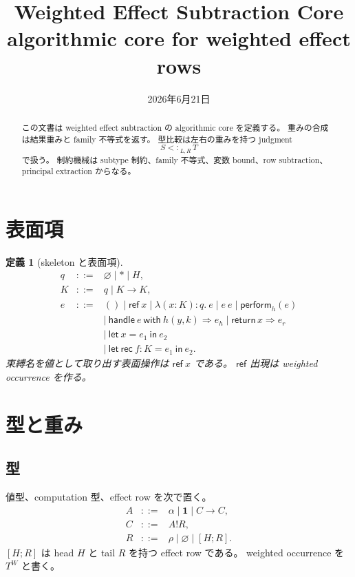 \documentclass[uplatex,dvipdfmx,a4paper,11pt]{jsarticle}
\title{Weighted Effect Subtraction Core\\
\large algorithmic core for weighted effect rows}
\author{}
\date{2026年6月21日}
\theoremstyle{jpplain}
\newtheorem{definition}{定義}[section]
\newcommand{\eff}{\mathbin{!}}
\newcommand{\row}[2]{[#1;#2]}
\newcommand{\emptyrow}{\varnothing}
\newcommand{\Unit}{\mathbf 1}
\newcommand{\subty}[3]{#1\mathrel{<:}_{#2,#3}}
\newcommand{\wocc}[2]{#1^{#2}}
\newcommand{\perform}{\mathsf{perform}}
\newcommand{\ret}{\mathsf{return}}
\newcommand{\handle}{\mathsf{handle}}
\newcommand{\with}{\mathsf{with}}
\begin{document}
\maketitle

\begin{abstract}
この文書は weighted effect subtraction の algorithmic core を定義する。
重みの合成は結果重みと family 不等式を返す。
型比較は左右の重みを持つ judgment
\[
  \subty{S}{L}{R}\,T
\]
で扱う。
制約機械は subtype 制約、family 不等式、変数 bound、row subtraction、principal extraction からなる。
\end{abstract}

\tableofcontents

\section{表面項}

\begin{definition}[skeleton と表面項]
\[
\begin{array}{rcl}
 q &::=& \emptyrow \mid \ast \mid H,\\
 K &::=& q \mid K\to K,\\[0.3em]
 e &::=& () \mid \mathsf{ref}\ x \mid \lambda(x:K):q.\ e \mid e\ e \mid \perform_h(e)\\
   && \mid\ \handle\ e\ \with\ h(y,k)\Rightarrow e_h\mid \ret\,x\Rightarrow e_r\\
   && \mid\ \mathsf{let}\ x=e_1\ \mathsf{in}\ e_2\\
   && \mid\ \mathsf{let\ rec}\ f:K=e_1\ \mathsf{in}\ e_2.
\end{array}
\]
束縛名を値として取り出す表面操作は \(\mathsf{ref}\ x\) である。
\(\mathsf{ref}\) 出現は weighted occurrence を作る。
\end{definition}

\section{型と重み}

\subsection{型}

値型、computation 型、effect row を次で置く。
\[
\begin{array}{rcl}
 A &::=& \alpha \mid \Unit \mid C\to C,\\
 C &::=& A\eff R,\\
 R &::=& \rho \mid \emptyrow \mid \row H R.
\end{array}
\]
\(\row H R\) は head \(H\) と tail \(R\) を持つ effect row である。
weighted occurrence を \(\wocc{T}{W}\) と書く。
\end{document}
